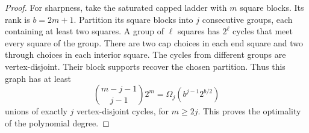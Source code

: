 \begin{proof}
For sharpness, take the saturated capped ladder with $m$ square blocks.
Its rank is $b=2m+1$.
Partition its square blocks into $j$ consecutive groups, each containing at least two squares.
A group of $\ell$ squares has $2^\ell$ cycles that meet every square of the group.
There are two cap choices in each end square and two through choices in each interior square.
The cycles from different groups are vertex-disjoint.
Their block supports recover the chosen partition.
Thus this graph has at least
\[
 \binom{m-j-1}{j-1}2^m
 =\Omega_j(b^{j-1}2^{b/2})
\]
unions of exactly $j$ vertex-disjoint cycles, for $m\ge2j$.
This proves the optimality of the polynomial degree.
\end{proof}
